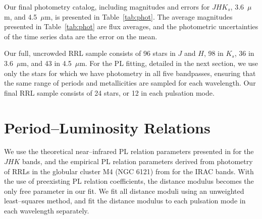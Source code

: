 \documentclass[a4paper,fleqn,usenatbib]{mnras}
\begin{document}
Our final photometry catalog, including magnitudes and errors for $J\!H\!K_s$, 3.6~$\mu$m, and 4.5~$\mu$m, is presented in Table~\ref{tab:phot}.
The average magnitudes presented in Table~\ref{tab:phot} are flux averages, and the photometric uncertainties of the time series data are the error on the mean.

Our full, uncrowded RRL sample consists of 96 stars in $J$ and $H$, 98 in $K_s$, 36 in 3.6~$\mu$m, and 43 in 4.5~$\mu$m. For the PL fitting, detailed in the next section, we use only the stars for which we have photometry in all five bandpasses, ensuring that the same range of periods and metallicities are sampled for each wavelength. Our final RRL sample consists of 24 stars, or 12 in each pulsation mode.

\section{Period--Luminosity Relations}
\label{sec:pl_relation}

We use the theoretical near--infrared PL relation parameters presented in \citet{2015ApJ...808...50M} for the $JHK$ bands, and the empirical PL relation parameters derived from photometry of RRLs in the globular cluster M4 (NGC 6121) from \citet{2015arXiv150507858N} for the IRAC bands. With the use of preexisting PL relation coefficients, the distance modulus becomes the only free parameter in our fit. We fit all distance moduli using an unweighted least--squares method, and fit the distance modulus to each pulsation mode in each wavelength separately.
\end{document}
